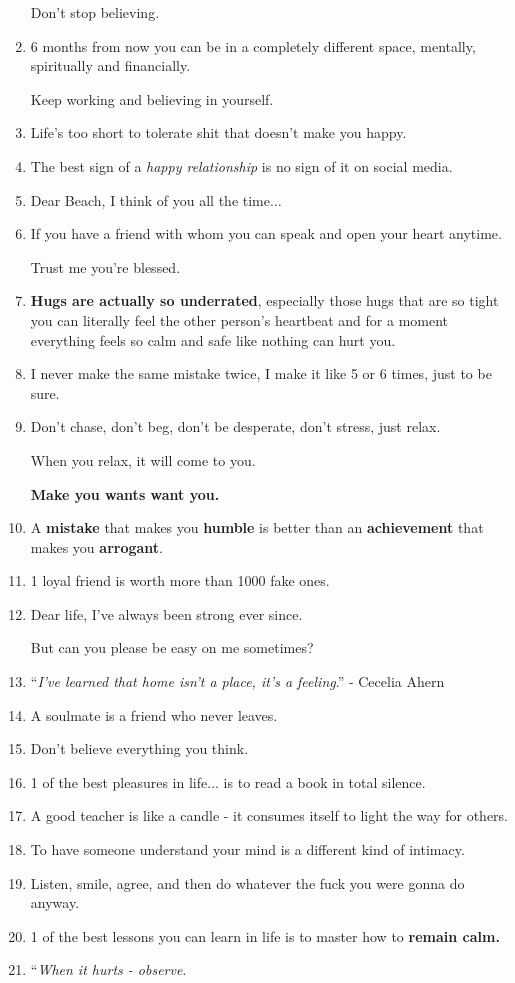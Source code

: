 \documentclass{article}
\begin{document}
\begin{enumerate}
	Don't stop believing.
	\item 6 months from now you can be in a completely different space, mentally, spiritually and financially.
	
	Keep working and believing in yourself.
	\item Life's too short to tolerate shit that doesn't make you happy.
	\item The best sign of a \textit{happy relationship} is no sign of it on social media.
	\item Dear Beach, I think of you all the time$\ldots$
	\item If you have a friend with whom you can speak and open your heart anytime.
	
	Trust me you're blessed.
	\item \textbf{Hugs are actually so underrated}, especially those hugs that are so tight you can literally feel the other person's heartbeat and for a moment everything feels so calm and safe like nothing can hurt you.
	\item I never make the same mistake twice, I make it like 5 or 6 times, just to be sure.
	\item Don't chase, don't beg, don't be desperate, don't stress, just relax.
	
	When you relax, it will come to you.
	
	\textbf{Make you wants want you.}
	\item A \textbf{mistake} that makes you \textbf{humble} is better than an \textbf{achievement} that makes you \textbf{arrogant}.
	\item 1 loyal friend is worth more than 1000 fake ones.
	\item Dear life, I've always been strong ever since.
	
	But can you please be easy on me sometimes?
	\item ``\textit{I've learned that home isn't a place, it's a feeling}.'' - Cecelia Ahern
	\item A soulmate is a friend who never leaves.
	\item Don't believe everything you think.
	\item 1 of the best pleasures in life$\ldots$ is to read a book in total silence.
	\item A good teacher is like a candle - it consumes itself to light the way for others.
	\item To have someone understand your mind is a different kind of intimacy.
	\item Listen, smile, agree, and then do whatever the fuck you were gonna do anyway.
	\item 1 of the best lessons you can learn in life is to master how to \textbf{remain calm.}
	\item ``\textit{When it hurts - observe}.
	

\end{enumerate}
\end{document}
